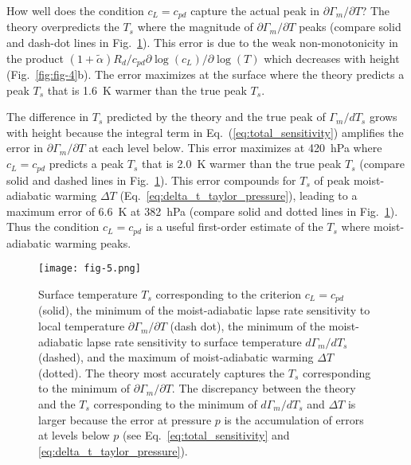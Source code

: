 \documentclass[]{ametsocV6.1}
\begin{document}
How well does the condition $c_L = c_{pd}$ capture the actual peak in $\partial\Gamma_m/\partial T$? The theory overpredicts the $T_s$ where the magnitude of $\partial\Gamma_m/\partial T$ peaks (compare solid and dash-dot lines in Fig.~\ref{fig:fig-5}). This error is due to the weak non-monotonicity in the product $(1+\tilde{\alpha})R_d/c_{pd}\partial\log(c_L)/\partial\log(T)$ which decreases with height (Fig.~\ref{fig:fig-4}b). The error maximizes at the surface where the theory predicts a peak $T_s$ that is 1.6~K warmer than the true peak $T_s$. 

The difference in $T_s$ predicted by the theory and the true peak of $\Gamma_m / d T_s$ grows with height because the integral term in Eq.~(\ref{eq:total_sensitivity}) amplifies the error in $\partial\Gamma_m / \partial T$ at each level below. This error maximizes at 420~hPa where $c_L = c_{pd}$ predicts a peak $T_s$ that is 2.0~K warmer than the true peak $T_s$ (compare solid and dashed lines in Fig.~\ref{fig:fig-5}). This error compounds for $T_s$ of peak moist-adiabatic warming $\Delta T$ (Eq.~\ref{eq:delta_t_taylor_pressure}), leading to a maximum error of 6.6~K at 382~hPa (compare solid and dotted lines in Fig.~\ref{fig:fig-5}). Thus the condition $c_L = c_{pd}$ is a useful first-order estimate of the $T_s$ where moist-adiabatic warming peaks.

\begin{figure}[htbp]
 \centering
 \texttt{[image: fig-5.png]}\\
 \caption{Surface temperature $T_s$ corresponding to the criterion $c_L=c_{pd}$ (solid), the minimum of the moist-adiabatic lapse rate sensitivity to local temperature $\partial \Gamma_m/\partial T$ (dash dot), the minimum of the moist-adiabatic lapse rate sensitivity to surface temperature $d \Gamma_m/dT_s$ (dashed), and the maximum of moist-adiabatic warming $\Delta T$ (dotted). The theory most accurately captures the $T_s$ corresponding to the minimum of $\partial \Gamma_m /\partial T$. The discrepancy between the theory and the $T_s$ corresponding to the minimum of $d\Gamma_m/dT_s$ and $\Delta T$ is larger because the error at pressure $p$ is the accumulation of errors at levels below $p$ (see Eq.~\ref{eq:total_sensitivity} and \ref{eq:delta_t_taylor_pressure}).}\label{fig:fig-5}
\end{figure}
\end{document}
